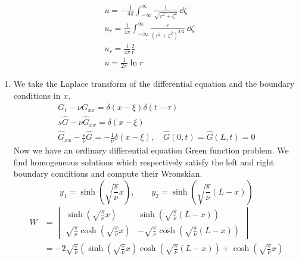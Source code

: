 {\begin{Solution}
\begin{enumerate}
\begin{gather*}
      u = - \frac{1}{4 \pi} \int_{-\infty}^\infty  \frac{ 1 }
      { \sqrt{ r^2 + \zeta^2 } } \,\dd \zeta 
      \\
      u_r = \frac{1}{4 \pi} \int_{-\infty}^\infty  \frac{ r }{ ( r^2 + \zeta^2 )^{3/2} } \,\dd \zeta 
      \\
      u_r = \frac{1}{4 \pi} \frac{2}{r}
      \\
      u = \frac{1}{2 \pi} \ln r
    \end{gather*}
  \end{enumerate}
\end{Solution}










\begin{Solution}
  \begin{enumerate}
  \item
    We take the Laplace transform of the differential equation and the 
    boundary conditions in $x$.
    \begin{gather*}
      G_t - \nu G_{x x} = \delta(x-\xi) \delta(t-\tau)
      \\
      s \hat{G} - \nu \hat{G}_{x x} = \delta(x-\xi)
      \\
      \hat{G}_{x x} - \frac{s}{\nu} \hat{G} = - \frac{1}{\nu} \delta(x-\xi), \quad
      \hat{G}(0,t) = \hat{G}(L,t) = 0
    \end{gather*}
    Now we have an ordinary differential equation Green function problem.
    We find homogeneous solutions which respectively satisfy the left and 
    right boundary conditions and compute their Wronskian.
    \[
    y_1 = \sinh \left( \sqrt{ \frac{s}{\nu} } x \right), \qquad
    y_2 = \sinh \left( \sqrt{ \frac{s}{\nu} } (L - x) \right)
    \]
    \begin{align*}
      W &= \begin{vmatrix}
        \sinh \left( \sqrt{ \frac{s}{\nu} } x \right) & 
        \sinh \left( \sqrt{ \frac{s}{\nu} } (L - x) \right)
        \\
        \sqrt{\frac{s}{\nu}} \cosh \left( \sqrt{ \frac{s}{\nu} } x \right) & 
        - \sqrt{\frac{s}{\nu}} \cosh \left( \sqrt{ \frac{s}{\nu} } (L - x) \right)
      \end{vmatrix}
      \\
      &= - 2 \sqrt{\frac{s}{\nu}} \left( 
        \sinh \left( \sqrt{ \frac{s}{\nu} } x \right)
        \cosh \left( \sqrt{ \frac{s}{\nu} } (L - x) \right) + 
        \cosh \left( \sqrt{ \frac{s}{\nu} } x \right)

\end{align*}
\end{enumerate}
\end{Solution}}
